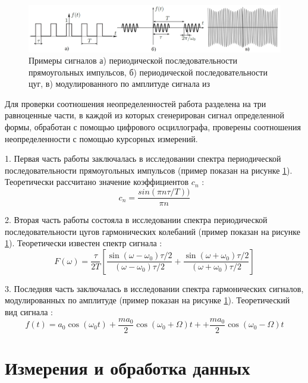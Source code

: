 \documentclass[a4paper,12pt]{article} %
\begin{document}
\begin{figure}[h!]
\begin{center}
\includegraphics[width=\textwidth]{пример}
\caption{Примеры сигналов а) периодической последовательности прямоугольных импульсов, б) периодической последовательности цуг, в) модулированного по амплитуде сигнала из \cite{labnik}} \label{пример}
\end{center}
\end{figure}
Для проверки соотношения неопределенностей работа разделена на три равноценные части, в каждой из которых сгенерирован сигнал определенной формы, обработан с помощью цифрового осциллографа, проверены соотношения неопределенности с помощью курсорных измерений.

1. Первая часть работы заключалась в исследовании спектра периодической последовательности прямоугольных импульсов (пример показан на рисунке \ref{пример}). 
Теоретически рассчитано значение коэффициентов $c_n$ \cite{labnik}:
\begin{equation}
c_n  = \dfrac{sin(\pi n \tau / T))}{\pi n}
\end{equation}

2. Вторая часть работы состояла в исследовании спектра периодической последовательности цугов гармонических колебаний (пример показан на рисунке \ref{пример}).
Теоретически известен спектр сигнала \cite{labnik}: 
\begin{equation}
F(\omega) = \dfrac{\tau}{2T}\left[\dfrac{\sin(\omega-\omega_0)\tau /2}
{(\omega-\omega_0)\tau /2}
 + \dfrac{\sin(\omega+\omega_0)\tau /2}{(\omega+\omega_0)\tau /2}\right]
\end{equation}

3. Последняя часть заключалась в исследовании спектра гармонических сигналов, модулированных по амплитуде  (пример показан на рисунке \ref{пример}).
Теоретический вид сигнала \cite{labnik}: 
\begin{equation}
f(t) = a_0 \cos (\omega_0 t) +\dfrac{ma_0}{2}\cos (\omega_0 +\Omega)t++\dfrac{ma_0}{2}\cos (\omega_0 -\Omega)t
\end{equation}



\section{Измерения и обработка данных}
\end{document}

